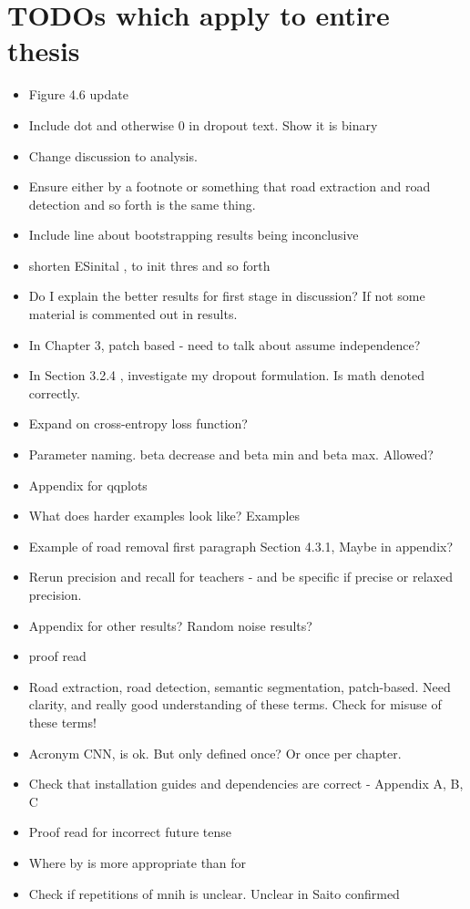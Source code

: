 \section{TODOs which apply to entire thesis}
\begin{itemize}
\item Figure 4.6 update
\item Include dot and otherwise 0 in dropout text. Show it is binary
\item Change discussion to analysis. 
\item Ensure either by a footnote or something that road extraction and road detection and so forth is the same thing.
\item Include line about bootstrapping results being inconclusive
\item shorten ESinital , to init thres and so forth
\item Do I explain the better results for first stage in discussion? If not some material is commented out in results.
\item In Chapter 3, patch based - need to talk about assume independence?
\item In Section 3.2.4 , investigate my dropout formulation. Is math denoted correctly.
\item Expand on cross-entropy loss function?
\item Parameter naming. beta decrease and beta min and beta max. Allowed?
\item Appendix for qqplots
\item What does harder examples look like? Examples
\item Example of road removal first paragraph Section 4.3.1, Maybe in appendix?
\item Rerun precision and recall for teachers - and be specific if precise or relaxed precision.
\item Appendix for other results? Random noise results? 
\item proof read
\item Road extraction, road detection, semantic segmentation, patch-based. Need clarity, and really good understanding of these terms. Check for misuse of these terms!
\item Acronym CNN, is ok. But only defined once? Or once per chapter.
\item Check that installation guides and dependencies are correct - Appendix A, B, C
\item Proof read for incorrect future tense
\item Where by is more appropriate than for
\item Check if repetitions of mnih  is unclear. Unclear in Saito confirmed
\end{itemize}
